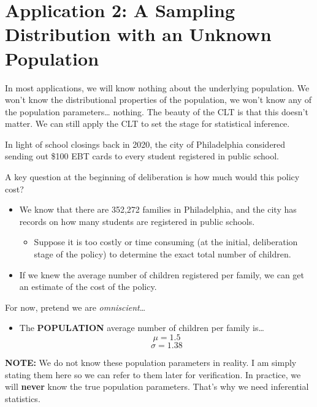 \documentclass[
]{book}
\providecommand{\tightlist}{%
  \setlength{\itemsep}{0pt}\setlength{\parskip}{0pt}}
\begin{document}
\section{Application 2: A Sampling Distribution with an Unknown Population}\label{application-2-a-sampling-distribution-with-an-unknown-population}

In most applications, we will know nothing about the underlying population. We won't know the distributional properties of the population, we won't know any of the population parameters\ldots{} nothing. The beauty of the CLT is that this doesn't matter. We can still apply the CLT to set the stage for statistical inference.

In light of school closings back in 2020, the city of Philadelphia considered sending out \$100 EBT cards to every student registered in public school.

A key question at the beginning of deliberation is how much would this policy cost?

\begin{itemize}
\item
  We know that there are 352,272 families in Philadelphia, and the city has records on how many students are registered in public schools.

  \begin{itemize}
  \tightlist
  \item
    Suppose it is too costly or time consuming (at the initial, deliberation stage of the policy) to determine the exact total number of children.
  \end{itemize}
\item
  If we knew the average number of children registered per family, we can get an estimate of the cost of the policy.
\end{itemize}

For now, pretend we are \emph{omniscient}\ldots{}

\begin{itemize}
\tightlist
\item
  The \textbf{POPULATION} average number of children per family is\ldots{}
  \[\mu = 1.5\]
  \[\sigma = 1.38\]
\end{itemize}

\textbf{NOTE:} We do not know these population parameters in reality. I am simply stating them here so we can refer to them later for verification. In practice, we will \textbf{never} know the true population parameters. That's why we need inferential statistics.
\end{document}
